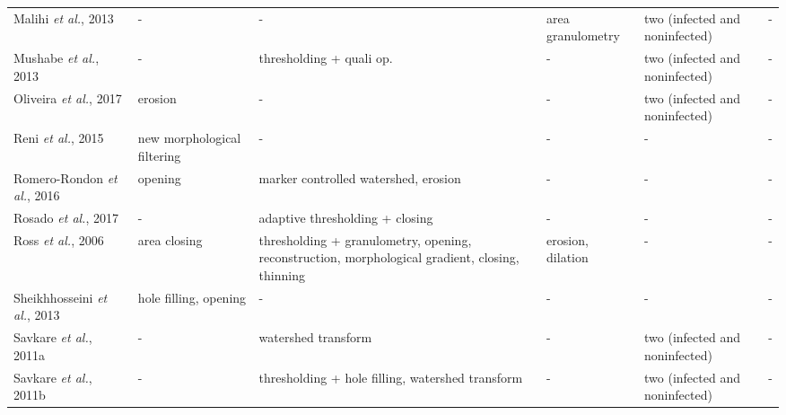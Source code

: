 \begin{longtable}{C{2.1cm} C{2.1cm} C{2.3cm} C{1.5cm} C{2.7cm} C{2.2cm} }
    Malihi \emph{et al.}, 2013  &
    	- &
    	-  &
    	area granulometry &
    	two (infected and noninfected) &
    	- \vspace{0.6cm} \\	

    Mushabe \emph{et al.}, 2013  &
    	- &
    	thresholding + quali op.  &
    	- &
    	two (infected and noninfected) &
    	- \vspace{0.6cm} \\	

    Oliveira \emph{et al.}, 2017  &
    	erosion &
    	-  &
    	- &
    	two (infected and noninfected) &
    	- \vspace{0.6cm} \\

    Reni \emph{et al.}, 2015  &
    	new morphological filtering &
    	-  &
    	- &
    	- &
    	- \vspace{0.6cm} \\

    Romero-Rondon \emph{et al.}, 2016  &
    	opening &
    	marker controlled watershed, erosion  &
    	- &
    	- &
    	- \vspace{0.6cm} \\

    Rosado \emph{et al.}, 2017  &
    	- &
    	adaptive thresholding + closing  &
    	- &
    	- &
    	- \vspace{0.6cm} \\

    Ross \emph{et al.}, 2006  &
    	area closing &
    	thresholding + granulometry, opening, reconstruction, morphological gradient, closing, thinning  &
    	erosion, dilation &
    	- &
    	- \vspace{0.6cm} \\

    Sheikhhosseini \emph{et al.}, 2013  &
    	hole filling, opening &
    	-  &
    	- &
    	- &
    	- \vspace{0.6cm} \\

    Savkare \emph{et al.}, 2011a  &
    	- &
    	watershed transform  &
    	- &
    	two (infected and noninfected) &
    	- \vspace{0.6cm} \\
    
    Savkare \emph{et al.}, 2011b  &
    	- &
    	thresholding + hole filling, watershed transform  &
    	- &
    	two (infected and noninfected) &
    	- \vspace{0.6cm} \\
    

\end{longtable}
